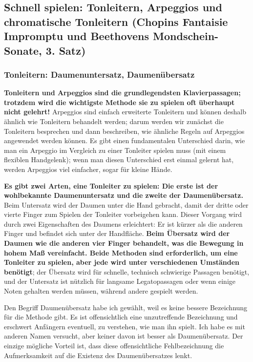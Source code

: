 
\subsection{Schnell spielen: Tonleitern, Arpeggios und chromatische Tonleitern (Chopins Fantaisie Impromptu und Beethovens Mondschein-Sonate, 3. Satz)}
\label{c1iii5}

\subsubsection{Tonleitern: Daumenuntersatz, Daumenübersatz}
\label{c1iii5a}

\textbf{Tonleitern und Arpeggios sind die grundlegendsten Klavierpassagen; trotzdem wird die wichtigste Methode sie zu spielen oft überhaupt nicht gelehrt!}
Arpeggios sind einfach erweiterte Tonleitern und können deshalb ähnlich wie Tonleitern behandelt werden; darum werden wir zunächst die Tonleitern besprechen und dann beschreiben, wie ähnliche Regeln auf Arpeggios angewendet werden können.
Es gibt einen fundamentalen Unterschied darin, wie man ein Arpeggio im Vergleich zu einer Tonleiter spielen muss (mit einem flexiblen Handgelenk); wenn man diesen Unterschied erst einmal gelernt hat, werden Arpeggios viel einfacher, sogar für kleine Hände.

\textbf{Es gibt zwei Arten, eine Tonleiter zu spielen: Die erste ist der wohlbekannte Daumenuntersatz und die zweite der Daumenübersatz.}
Beim Untersatz wird der Daumen unter die Hand gebracht, damit der dritte oder vierte Finger zum Spielen der Tonleiter vorbeigehen kann.
Dieser Vorgang wird durch zwei Eigenschaften des Daumens erleichtert: Er ist kürzer als die anderen Finger und befindet sich unter der Handfläche.
\textbf{Beim Übersatz wird der Daumen wie die anderen vier Finger behandelt, was die Bewegung in hohem Maß vereinfacht.
Beide Methoden sind erforderlich, um eine Tonleiter zu spielen, aber jede wird unter verschiedenen Umständen benötigt}; der Übersatz wird für schnelle, technisch schwierige Passagen benötigt, und der Untersatz ist nützlich für langsame Legatopassagen oder wenn einige Noten gehalten werden müssen, während andere gespielt werden.

Den Begriff Daumenübersatz habe ich gewählt, weil es keine bessere Bezeichnung für die Methode gibt.
Es ist offensichtlich eine unzutreffende Bezeichnung und erschwert Anfängern eventuell, zu verstehen, wie man ihn spielt.
Ich habe es mit anderen Namen versucht, aber keiner davon ist besser als Daumenübersatz.
Der einzige mögliche Vorteil ist, dass diese offensichtliche Fehlbezeichnung die Aufmerksamkeit auf die Existenz des Daumenübersatzes lenkt.

